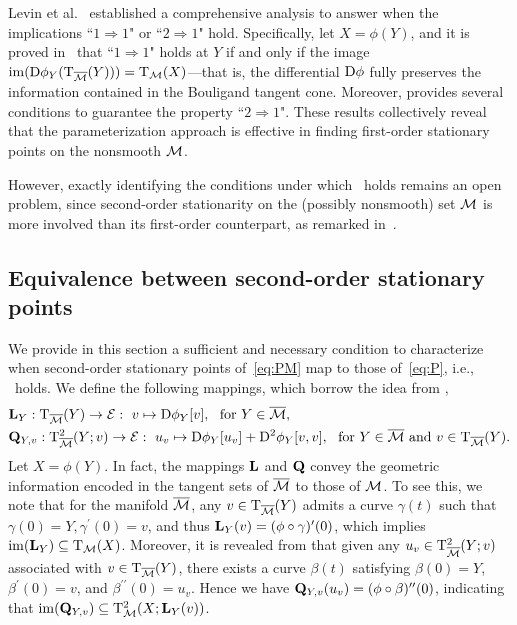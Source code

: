 Levin et al.~\cite{levin2025effect} established a comprehensive analysis to answer when the implications ``$1\!\Rightarrow\!1$" or ``$2\!\Rightarrow\!1$" hold. Specifically, let $X=\phi(Y)$, and it is proved in~\cite[Theorem 2.4]{levin2025effect} that ``$1\!\Rightarrow\!1$" holds at $Y$ if and only if the image $\operatorname{im}(\mathrm{D} \phi_Y(\mathrm{T}_{\overline{\mathcal{M}}}(Y)))=\mathrm{T}_{\mathcal{M}}(X)$---that is, the differential $\mathrm{D} \phi$ fully preserves the information contained in the Bouligand tangent cone. Moreover, \cite[Theorem 3.23]{levin2025effect} provides several conditions to guarantee the property ``$2\!\Rightarrow\!1$". These results collectively reveal that the parameterization approach is effective in finding first-order stationary points on the nonsmooth $\mathcal{M}$.

However, exactly identifying the conditions under which \twototwo\ holds remains an open problem, since second-order stationarity on the (possibly nonsmooth) set $\mathcal{M}$ is more involved than its first-order counterpart, as remarked in~\cite[\S 6]{levin2025effect}. 

\subsection{Equivalence between second-order stationary points}\label{sec:equi_2ndpoints}
We provide in this section a sufficient and necessary condition to characterize when second-order stationary points of~\eqref{eq:PM} map to those of~\eqref{eq:P}, i.e., \twototwo\ holds. We define the following mappings, which borrow the idea from \cite{levin2025effect},
\begin{align*}
    &\tanL_Y:\tangent_{\bmanifold}(Y)\to\eanifold:\ v\mapsto \diff\phi_Y[v],\ \ \text{for}\ Y\in\bmanifold,
    \\
    &\tanQ_{Y,v}:\tangenttwo_{\bmanifold}(Y;v)\to\eanifold:\ u_v\mapsto \diff\phi_Y[u_v]+\diff^2\phi_Y [v,v],\ \ \text{for}\ Y\in\bmanifold\ \text{and}\ v\in\tangent_{\bmanifold}(Y).
\end{align*}
Let $X=\phi(Y)$. In fact, the mappings $\mathrm{\bf L}$ and $\mathrm{\bf Q}$ convey the geometric information encoded in the tangent sets of $\overline{\mathcal{M}}$ to those of $\mathcal{M}$. To see this, we note that for the manifold $\overline{\mathcal{M}}$, any $v\in\mathrm{T}_{\overline{\mathcal{M}}}(Y)$ admits a curve $\gamma(t)$ such that $\gamma(0)=Y,\gamma^\prime(0)=v$, and thus $\mathrm{\bf L}_Y(v)=(\phi\circ\gamma)^{\prime}(0)$, which implies $\operatorname{im}(\mathrm{\bf L}_Y)\subseteq\mathrm{T}_{\mathcal{M}}(X)$. Moreover, it is revealed from \cite[Proposition 13.13]{rockafellar2009variationalanalysis} that given any $u_v\in\mathrm{T}^2_{\overline{\mathcal{M}}}(Y;v)$ associated with $v\in\mathrm{T}_{\overline{\mathcal{M}}}(Y)$, there exists a curve $\beta(t)$ satisfying $\beta(0)=Y$, $\beta^\prime(0)=v$, and $\beta^{\prime\prime}(0)=u_v$. Hence we have $\mathrm{\bf Q}_{Y,v}(u_v)=(\phi\circ \beta)^{\prime\prime}(0)$, indicating that $\operatorname{im}(\mathrm{\bf Q}_{Y,v})\subseteq \mathrm{T}^2_{\mathcal{M}}(X;\mathrm{\bf L}_Y(v))$. 


